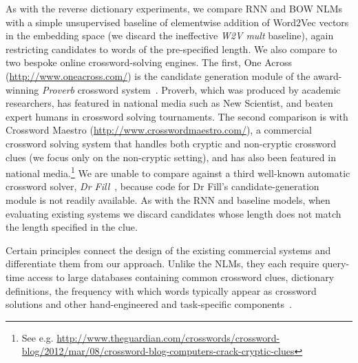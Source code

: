 As with the reverse dictionary experiments, we compare RNN and BOW NLMs with a
simple unsupervised baseline of elementwise addition of Word2Vec vectors in the
embedding space (we discard the ineffective \emph{W2V mult} baseline), again
restricting candidates to words of the pre-specified length. We also compare to
two bespoke online crossword-solving engines. The first, One Across
(\url{http://www.oneacross.com/}) is the candidate generation module of the
award-winning \emph{Proverb} crossword system~\cite{littman2002probabilistic}.
Proverb, which was produced by academic researchers, has featured in national
media such as New Scientist, and beaten expert humans in crossword solving
tournaments. The second comparison is with Crossword Maestro
(\url{http://www.crosswordmaestro.com/}), a commercial crossword solving system
that handles both cryptic and non-cryptic crossword clues (we focus only on the
non-cryptic setting), and has also been featured in national
media.\footnote{
    See e.g.
    \url{http://www.theguardian.com/crosswords/crossword-blog/2012/mar/08/crossword-blog-computers-crack-cryptic-clues}
}
We are unable to compare against a third well-known automatic crossword solver,
\emph{Dr Fill}~\cite{ginsberg2011dr}, because code for Dr Fill's
candidate-generation module is not readily available. As with the RNN and
baseline models, when evaluating existing systems we discard candidates whose
length does not match the length specified in the clue.  

Certain principles connect the design of the existing commercial systems and differentiate them from our approach. Unlike the NLMs, they each require query-time access to large databases containing common crossword clues, dictionary definitions, the frequency with which words typically appear as crossword solutions and other hand-engineered and task-specific components~\cite{littman2002probabilistic,ginsberg2011dr}. 

